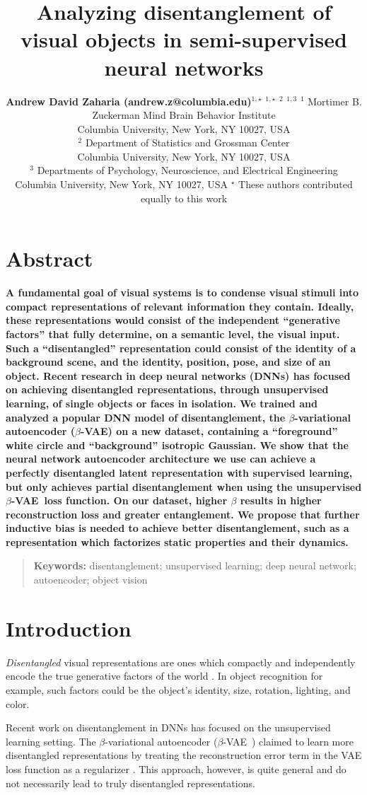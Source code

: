 \documentclass[10pt,letterpaper]{article}
\title{Analyzing disentanglement of visual objects in semi-supervised neural networks}
\author{{\large \bf Andrew David Zaharia (andrew.z@columbia.edu)}$^{1,\star}$
  \AND {\large \bf Benjamin Peters (benjamin.peters@columbia.edu)}$^{1,\star}$
  \AND {\large \bf John Cunningham (jpc2181@columbia.edu)}$^2$
  \AND {\large \bf Nikolaus Kriegeskorte (n.kriegeskorte@columbia.edu)}$^{1,3}$
  \AND $^1$ Mortimer B. Zuckerman Mind Brain Behavior Institute\\
  Columbia University, New York, NY 10027, USA\\
  $^2$ Department of Statistics and Grossman Center\\
  Columbia University, New York, NY 10027, USA\\
  $^3$ Departments of Psychology, Neuroscience, and Electrical Engineering\\
  Columbia University, New York, NY 10027, USA
  \AND $^\star$ These authors contributed equally to this work}
\newcommand{\bvae}{$\beta$-VAE~}
\begin{document}
\maketitle

\section{Abstract}
{
\bf
A fundamental goal of visual systems is to condense visual stimuli into compact representations of relevant information they contain. Ideally, these representations would consist of the independent ``generative factors'' that fully determine, on a semantic level, the visual input. Such a ``disentangled'' representation could consist of the identity of a background scene, and the identity, position, pose, and size of an object. Recent research in deep neural networks (DNNs) has focused on achieving disentangled representations, through unsupervised learning, of single objects or faces in isolation. We trained and analyzed a popular DNN model of disentanglement, the $\beta$-variational autoencoder ($\beta$-VAE) on a new dataset, containing a ``foreground'' white circle and ``background'' isotropic Gaussian. We show that the neural network autoencoder architecture we use can achieve a perfectly disentangled latent representation with supervised learning, but only achieves partial disentanglement when using the unsupervised \bvae loss function. On our dataset, higher $\beta$ results in higher reconstruction loss and greater entanglement. We propose that further inductive bias is needed to achieve better disentanglement, such as a representation which factorizes static properties and their dynamics.
}
\begin{quote}
\small
\textbf{Keywords:} 
disentanglement; unsupervised learning; deep neural network; autoencoder; object vision
\end{quote}


\section{Introduction}

 \textit{Disentangled} visual representations are ones which compactly and independently encode the true generative factors of the world \cite{DiCarlo2007,Bengio2009}. In object recognition for example, such factors could be the object's identity, size, rotation, lighting, and color.

 Recent work on disentanglement in DNNs has focused on the unsupervised learning setting. The $\beta$-variational autoencoder (\bvae) claimed to learn more disentangled representations by treating the reconstruction error term in the VAE loss function as a regularizer \cite{Higgins2017,Kingma2014}. This approach, however, is quite general and do not necessarily lead to truly disentangled representations.
\end{document}
